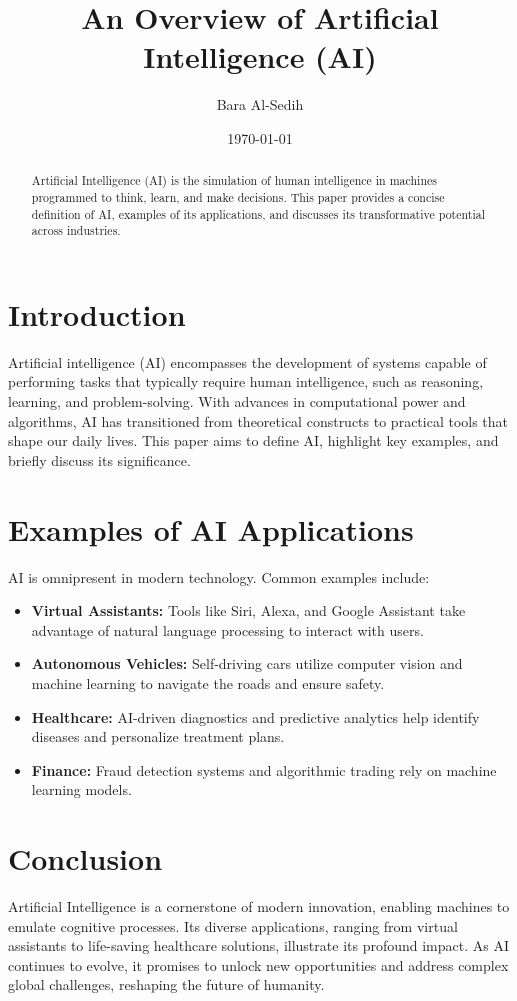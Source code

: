 \documentclass[12pt,a4paper]{article}
\title{An Overview of Artificial Intelligence (AI)}
\author{Bara Al-Sedih}
\date{\today}
\begin{document}
\maketitle

\begin{abstract}
Artificial Intelligence (AI) is the simulation of human intelligence in machines programmed to think, learn, and make decisions. This paper provides a concise definition of AI, examples of its applications, and discusses its transformative potential across industries.
\end{abstract}

\section{Introduction}
Artificial intelligence (AI) encompasses the development of systems capable of performing tasks that typically require human intelligence, such as reasoning, learning, and problem-solving. With advances in computational power and algorithms, AI has transitioned from theoretical constructs to practical tools that shape our daily lives. This paper aims to define AI, highlight key examples, and briefly discuss its significance.

\section{Examples of AI Applications}
AI is omnipresent in modern technology. Common examples include:
\begin{itemize}
    \item \textbf{Virtual Assistants:} Tools like Siri, Alexa, and Google Assistant take advantage of natural language processing to interact with users.
    \item \textbf{Autonomous Vehicles:} Self-driving cars utilize computer vision and machine learning to navigate the roads and ensure safety.
    \item \textbf{Healthcare:} AI-driven diagnostics and predictive analytics help identify diseases and personalize treatment plans.
    \item \textbf{Finance:} Fraud detection systems and algorithmic trading rely on machine learning models.
\end{itemize}

\section{Conclusion}
Artificial Intelligence is a cornerstone of modern innovation, enabling machines to emulate cognitive processes. Its diverse applications, ranging from virtual assistants to life-saving healthcare solutions, illustrate its profound impact. As AI continues to evolve, it promises to unlock new opportunities and address complex global challenges, reshaping the future of humanity.
\end{document}
